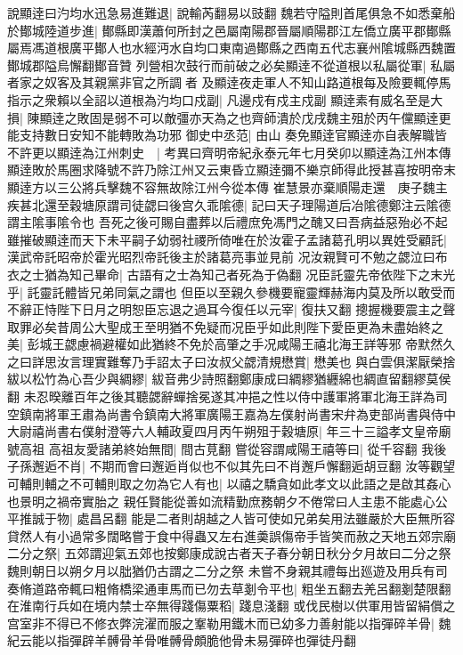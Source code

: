 說顯逹曰汋均水迅急易進難退|{
	說輸芮翻易以豉翻}
魏若守隘則首尾俱急不如悉棄船於鄼城陸道步進|{
	鄼縣即漢蕭何所封之邑屬南陽郡晉屬順陽郡江左僑立廣平郡鄼縣屬焉馮道根廣平鄼人也水經沔水自均口東南過鄼縣之西南五代志襄州隂城縣西魏置鄼城郡隘烏懈翻鄼音贊}
列營相次鼓行而前破之必矣顯逹不從道根以私屬從軍|{
	私屬者家之奴客及其親黨非官之所調者}
及顯逹夜走軍人不知山路道根每及險要輒停馬指示之衆賴以全詔以道根為汋均口戍副|{
	凡邊戍有戍主戍副}
顯逹素有威名至是大損|{
	陳顯逹之敗固是弱不可以敵彊亦天為之也齊師潰於戊戌魏主殂於丙午儻顯逹更能支持數日安知不能轉敗為功邪}
御史中丞范|{
	由山}
奏免顯逹官顯逹亦自表解職皆不許更以顯逹為江州刺史　|{
	考異曰齊明帝紀永泰元年七月癸卯以顯逹為江州本傳顯逹敗於馬圈求降號不許乃除江州又云東昏立顯逹彌不樂京師得此授甚喜按明帝末顯逹方以三公將兵擊魏不容無故除江州今從本傳}
崔慧景亦棄順陽走還　庚子魏主疾甚北還至穀塘原謂司徒勰曰後宫久乖隂德|{
	記曰天子理陽道后冶隂德鄭注云隂德謂主隂事隂令也}
吾死之後可賜自盡葬以后禮庶免馮門之醜又曰吾病益惡殆必不起雖摧破顯逹而天下未平嗣子幼弱社禝所倚唯在於汝霍子孟諸葛孔明以異姓受顧託|{
	漢武帝託昭帝於霍光昭烈帝託後主於諸葛亮事並見前}
况汝親賢可不勉之勰泣曰布衣之士猶為知己畢命|{
	古語有之士為知己者死為于偽翻}
况臣託靈先帝依陛下之末光乎|{
	託靈託體皆兄弟同氣之謂也}
但臣以至親久參機要寵靈輝赫海内莫及所以敢受而不辭正恃陛下日月之明恕臣忘退之過耳今復任以元宰|{
	復扶又翻}
摠握機要震主之聲取罪必矣昔周公大聖成王至明猶不免疑而况臣乎如此則陛下愛臣更為未盡始終之美|{
	彭城王勰慮禍避權如此猶終不免於高肇之手况咸陽王禧北海王詳等邪}
帝默然久之曰詳思汝言理實難奪乃手詔太子曰汝叔父勰清規懋賞|{
	懋美也}
與白雲俱潔厭榮捨紱以松竹為心吾少與綢繆|{
	紱音弗少詩照翻鄭康成曰綢繆猶纒綿也綢直留翻繆莫侯翻}
未忍暌離百年之後其聽勰辭蟬捨冕遂其冲挹之性以侍中護軍將軍北海王詳為司空鎮南將軍王肅為尚書令鎮南大將軍廣陽王嘉為左僕射尚書宋弁為吏部尚書與侍中大尉禧尚書右僕射澄等六人輔政夏四月丙午朔殂于穀塘原|{
	年三十三謚孝文皇帝廟號高祖}
高祖友愛諸弟終始無間|{
	間古莧翻}
嘗從容謂咸陽王禧等曰|{
	從千容翻}
我後子孫邂逅不肖|{
	不期而會曰邂逅肖似也不似其先曰不肖邂戶懈翻逅胡豆翻}
汝等觀望可輔則輔之不可輔則取之勿為它人有也|{
	以禧之驕貪如此孝文以此語之是啟其姦心也景明之禍帝實胎之}
親任賢能從善如流精勤庶務朝夕不倦常曰人主患不能處心公平推誠于物|{
	處昌呂翻}
能是二者則胡越之人皆可使如兄弟矣用法雖嚴於大臣無所容貸然人有小過常多闊略嘗于食中得蟲又左右進羮誤傷帝手皆笑而赦之天地五郊宗廟二分之祭|{
	五郊謂迎氣五郊也按鄭康成說古者天子春分朝日秋分夕月故曰二分之祭魏則朝日以朔夕月以朏猶仍古謂之二分之祭}
未嘗不身親其禮每出廵遊及用兵有司奏脩道路帝輒曰粗脩橋梁通車馬而已勿去草剗令平也|{
	粗坐五翻去羌呂翻剗楚限翻}
在淮南行兵如在境内禁士卒無得踐傷粟稻|{
	踐息淺翻}
或伐民樹以供軍用皆留絹償之宫室非不得已不修衣弊浣濯而服之鞌勒用鐵木而已幼多力善射能以指彈碎羊骨|{
	魏紀云能以指彈辟羊髆骨羊骨唯髆骨頗脆他骨未易彈碎也彈徒丹翻}
